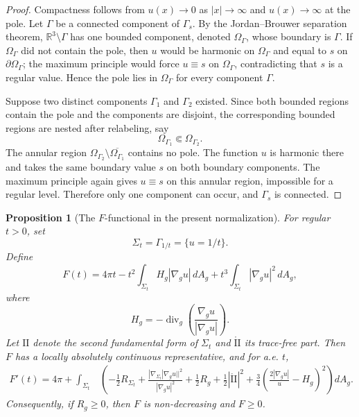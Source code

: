 \documentclass[11pt]{amsart}
\numberwithin{equation}{section}
\newtheorem{proposition}[theorem]{Proposition}
\theoremstyle{definition}
\newcommand{\R}{\mathbb R}
\newcommand{\II}{\mathrm{II}}
\begin{document}
\begin{proof}
Compactness follows from $u(x)\to0$ as $|x|\to\infty$ and $u(x)\to\infty$ at the pole.  Let $\Gamma$ be a connected component of $\Gamma_s$.  By the Jordan--Brouwer separation theorem, $\R^3\setminus\Gamma$ has one bounded component, denoted $\Omega_\Gamma$, whose boundary is $\Gamma$.  If $\Omega_\Gamma$ did not contain the pole, then $u$ would be harmonic on $\Omega_\Gamma$ and equal to $s$ on $\partial\Omega_\Gamma$; the maximum principle would force $u\equiv s$ on $\Omega_\Gamma$, contradicting that $s$ is a regular value.  Hence the pole lies in $\Omega_\Gamma$ for every component $\Gamma$.

Suppose two distinct components $\Gamma_1$ and $\Gamma_2$ existed.  Since both bounded regions contain the pole and the components are disjoint, the corresponding bounded regions are nested after relabeling, say
$$
        \Omega_{\Gamma_1}\Subset \Omega_{\Gamma_2}.
$$
The annular region $\Omega_{\Gamma_2}\setminus\overline{\Omega_{\Gamma_1}}$ contains no pole.  The function $u$ is harmonic there and takes the same boundary value $s$ on both boundary components.  The maximum principle again gives $u\equiv s$ on this annular region, impossible for a regular level.  Therefore only one component can occur, and $\Gamma_s$ is connected.
\end{proof}

\begin{proposition}[The $F$-functional in the present normalization]\label{prop:F-functional-facts}
For regular $t>0$, set
$$
        \Sigma_t=\Gamma_{1/t}=\{u=1/t\}.
$$
Define
\begin{equation}\label{eq:F-appendix-def}
        F(t)=4\pi t-t^2\int_{\Sigma_t}H_g|\nabla_g u|\,dA_g
        +t^3\int_{\Sigma_t}|\nabla_g u|^2\,dA_g,
\end{equation}
where
$$
        H_g=-\operatorname{div}_g\left(\frac{\nabla_g u}{|\nabla_g u|}\right).
$$
Let $\II$ denote the second fundamental form of $\Sigma_t$ and $\mathring{\II}$ its trace-free part.  Then $F$ has a locally absolutely continuous representative, and for a.e. $t$,
\begin{equation}\label{eq:F-prime-appendix}
\begin{aligned}
        F'(t)=4\pi+
        \int_{\Sigma_t}&\left(
        -\frac12R_{\Sigma_t}
        +\frac{|\nabla_{\Sigma_t}|\nabla_g u||^2}{|\nabla_g u|^2}
        +\frac12R_g
        +\frac12|\mathring{\II}|^2 
        +\frac34\left(\frac{2|\nabla_g u|}{u}-H_g\right)^2
        \right)dA_g.
\end{aligned}
\end{equation}
Consequently, if $R_g\ge0$, then $F$ is non-decreasing and $F\ge0$.
\end{proposition}
\end{document}

